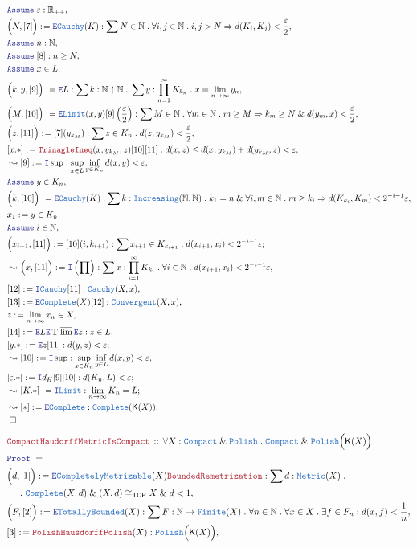 \documentclass[12pt]{scrartcl}
\newcommand{\TYPE}[1]{\textcolor{NavyBlue}{\mathtt{#1}}}
\newcommand{\LOGIC}[1]{\textcolor{Blue}{\mathtt{#1}}}
\newcommand{\THM}[1]{\textcolor{Maroon}{\mathtt{#1}}}
\renewcommand{\.}{\; . \;}
\newcommand{\de}{: \kern 0.1pc =}
\newcommand{\Act}[1]{\left( #1 \right)}
\newcommand{\Theorem}[2]{& \THM{#1} \, :: \, #2 \\ & \Proof = \\ }
\newcommand{\NewLine}{\\ & \kern 1pc}
\newcommand{\Page}[1]{ \begin{align*} #1 \end{align*}   }
\renewcommand{\And}{\; \& \;}
\newcommand{\Imply}{\Rightarrow}
\newcommand{\Intro}{\LOGIC{I}}
\newcommand{\Elim}{\LOGIC{E}}
\newcommand{\Reals}{\mathbb{R} }
\newcommand{\Nat}{\mathbb{N} }
\newcommand{\Say}[3]{& #1 \de #2 : #3, \\}
\newcommand{\SayIn}[3]{& #1 \de #2 \in #3, \\}
\newcommand{\Conclude}[3]{& #1 \de #2 : #3; \\}
\newcommand{\Derive}[3]{& \leadsto #1 \de #2 : #3, \\}
\newcommand{\DeriveConclude}[3]{& \leadsto #1 \de #2 : #3 ; \\}
\newcommand{\Assume}[2]{& \LOGIC{Assume} \; #1 : #2, \\}
\newcommand{\AssumeIn}[2]{& \LOGIC{Assume} \; #1 \in #2, \\}
\newcommand{\QED}{\; \square}
\newcommand{\EndProof}{& \QED \\}
\newcommand{\Proof}{\LOGIC{Proof} \; }
\newcommand{\Compact}{\TYPE{Compact}}
\newcommand{\TOP}{\mathsf{TOP}}
\newcommand{\Polish}{\TYPE{Polish}}
\DeclareMathOperator*{\Tul}{{T\;\overline{lim}}}
\newcommand{\K}{\mathsf{K}}
\begin{document}
\Page{
	\Assume{\varepsilon}{\Reals_{++}}
	\Say{\Big(N,[7]\Big)}{\Elim \TYPE{Cauchy}(K)}
	{
		\sum N \in \Nat \. 
		\forall i,j \in \Nat \.
		i,j > N 
		\Imply
		d(K_i,K_j) < \frac{\varepsilon}{2}
	}
	\Assume{n}{\Nat}
	\Assume{[8]}{n \ge N }
	\AssumeIn{x}{L}
	\Say{\Big(k,y,[9]\Big)}{\Elim L}{\sum k : \Nat \uparrow\Nat \.  \sum y : \prod^\infty_{n=1} K_{k_n} \. x = \lim_{n \to \infty} y_n}
	\Say{\Big(M,[10]\Big)}{\Elim \TYPE{Limit}(x,y)[9]\left( \frac{\varepsilon}{2} \right)}
	{
		\sum M \in \Nat \. \forall m \in \Nat \. m \ge M \Imply  k_m \ge N \And d(y_m,x) < \frac{\varepsilon}{2}
	}
	\Say{\Big(z,[11]\Big)}{[7](y_{k_M})}{\sum z \in K_n \.  d(z,y_{k_M}) < \frac{\varepsilon}{2}}
	\Conclude{[x.*]}{\THM{TrinagleIneq}(x,y_{k_M},z)[10][11]}
	{
		d(x,z) \le  d(x,y_{k_M}) + d(y_{k_M},z) < \varepsilon
	}
	\Derive{[9]}{\Intro \sup }{ \sup_{x \in L} \inf_{y \in K_n} d(x,y) < \varepsilon  }
	\AssumeIn{y}{K_n}
	\Say{\Big(k,[10]\Big)}{\Elim \TYPE{Cauchy}(K)}
	{
		\sum k : \TYPE{Increasing}(\Nat,\Nat) \. k_1 = n 
		\And \forall i,m \in \Nat \. 
		m \ge k_i \Imply  
		d( K_{k_i}, K_m ) < 2^{-i-1} \varepsilon
	}
	\SayIn{x_1}{y}{K_n}
	\AssumeIn{i}{\Nat}
	\Conclude{\Big(x_{i+1},[11]\Big)}{[10](i,k_{i+1})}
	{
		\sum x_{i+1} \in K_{k_{i+1}} \. d( x_{i+1},x_i) <  2^{-i-1}\varepsilon
	}
	\Derive{\Big(x,[11]\Big)}{\Intro\Act{\prod}}
	{
		\sum x : \prod^\infty_{i=1} K_{k_i} \. 
		\forall i \in \Nat \. d(x_{i+1},x_i) < 2^{-i-1}\varepsilon
	}
	\Say{[12]}{\Intro \TYPE{Cauchy}[11]}{\TYPE{Cauchy}(X,x)}
	\Say{[13]}{\Elim \TYPE{Complete}(X)[12]}{\TYPE{Convergent}(X,x)}
	\SayIn{z}{\lim_{n \to \infty} x_n}{X}
	\Say{[14]}{\Elim L \Elim \Tul \Elim z}{z \in L}
	\Conclude{[y.*]}{\Elim z [11]}{d(y,z) < \varepsilon}
	\Derive{[10]}{\Intro \sup }{ \sup_{x \in K_n} \inf_{y \in L} d(x,y) < \varepsilon  }
	\Conclude{[\varepsilon.*]}{\Intro d_H[9][10]}{ d(K_n,L) < \varepsilon}
	\DeriveConclude{[K.*]}{\Intro \TYPE{Limit}}
	{
		\lim_{n \to \infty} K_n = L
	}
	\DeriveConclude{[*]}{\Elim \TYPE{Complete}}{\TYPE{Complete}(\K(X))}
	\EndProof
}\Page{
	\Theorem{CompactHaudorffMetricIsCompact}{
		\forall X : \Compact \And \Polish \.
		\Compact \And \Polish\Big( \K(X) \Big)
	}
	\Say{\Big(d,[1]\Big)}
	{
		\Elim \TYPE{CompletelyMetrizable}(X) \THM{BoundedRemetrization}
	}
	{
		\sum d : \TYPE{Metric}(X) \. 
		\NewLine \.
		\TYPE{Complete}(X,d) \And (X,d) \cong_\TOP X \And d < 1
	}
	\Say{\Big(F,[2]\Big)}{\Elim \TYPE{TotallyBounded}(X)}
	{
		\sum F : \Nat \to \TYPE{Finite}(X) \. 
		\forall n \in \Nat \. 
		\forall x \in X \.
		\exists f \in F_n :
		d(x,f) < \frac{1}{n}
	}
	\Say{[3]}{\THM{PolishHausdorffPolish}(X)}{\Polish\Big(\K(X)\Big)}
}
\end{document}
